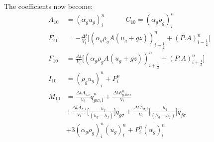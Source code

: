 \documentclass[11pt,letterpaper,titlepage]{article}
\newcommand{\half}{\frac{1}{2}}
\begin{document}
The coefficients now become:
\begin{equation*}
\begin{aligned}
A_{10} & = (\alpha_g u_g)_i^n \quad \quad \quad C_{10} = (\alpha_g\rho_g)_i^n \\
E_{10} & = -\frac{\Delta t}{V_i}\biggr[ (\alpha_g\rho_g A(u_g+gz))_{i-\half}^n 
           + (P.A)_{i-\half}^n \biggr] \\
F_{10} & =  \frac{\Delta t}{V_i}\biggr[ (\alpha_g\rho_g A(u_g+gz))_{i+\half}^n  
           + (P.A)_{i+\half}^n   \biggr] \\
I_{10} & = (\rho_g u_g)_i^n+P_i^n \\
M_{10} & = \frac{\Delta t A_{s,i}}{V_i}\dot{q}_{gw,i}^n 
         + \frac{\Delta tE_{g,loss}^n}{V_i}\\
        &+ \frac{\Delta tA_{\sigma,i}}{V_i} \biggr[\frac{- h_f  }{(h_g-h_f)}   \biggr]\dot{q}_{g\sigma}
         + \frac{\Delta tA_{\sigma,i}}{V_i} \biggr[\frac{ - h_g }{(h_g-h_f)}  \biggr]\dot{q}_{f\sigma}\\
        &+ 3(\alpha_g\rho_g)^n_i(u_g)_i^{n}
         + P_i^n (\alpha_g)_i^n
\end{aligned}
\end{equation*}
\newpage
\end{document}
